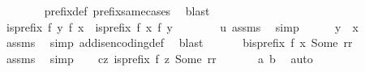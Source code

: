 \begin{isabellebody}
\ \ \ \ \ \ \isamarkupfalse%
\ prefix{\isacharunderscore}{\kern0pt}def\ prefix{\isacharunderscore}{\kern0pt}same{\isacharunderscore}{\kern0pt}cases\ \isamarkupfalse%
\ blast\isanewline
\ \ \ \ \isamarkupfalse%
\ {\isachardoublequoteopen}is{\isacharunderscore}{\kern0pt}prefix\ {\isacharparenleft}{\kern0pt}f\ y{\isacharparenright}{\kern0pt}\ {\isacharparenleft}{\kern0pt}f\ x{\isacharparenright}{\kern0pt}\ {\isasymor}\ is{\isacharunderscore}{\kern0pt}prefix\ {\isacharparenleft}{\kern0pt}f\ x{\isacharparenright}{\kern0pt}\ {\isacharparenleft}{\kern0pt}f\ y{\isacharparenright}{\kern0pt}{\isachardoublequoteclose}\isanewline
\ \ \ \ \ \ \isamarkupfalse%
\ u{\isacharunderscore}{\kern0pt}{}\ assms{\isacharparenleft}{\kern0pt}{}{\isacharparenright}{\kern0pt}\ \isamarkupfalse%
\ simp\isanewline
\ \ \ \ \isamarkupfalse%
\ {\isachardoublequoteopen}y\ {\isacharequal}{\kern0pt}\ x{\isachardoublequoteclose}\isanewline
\ \ \ \ \ \ \isamarkupfalse%
\ assms{\isacharparenleft}{\kern0pt}{}{\isacharparenright}{\kern0pt}\ \isamarkupfalse%
\ {\isacharparenleft}{\kern0pt}simp\ add{\isacharcolon}{\kern0pt}is{\isacharunderscore}{\kern0pt}encoding{\isacharunderscore}{\kern0pt}def{\isacharparenright}{\kern0pt}\ \isamarkupfalse%
\ blast\isanewline
\ \ \isamarkupfalse%
\isanewline
\ \ \isamarkupfalse%
\ b{\isacharcolon}{\kern0pt}{\isachardoublequoteopen}is{\isacharunderscore}{\kern0pt}prefix\ {\isacharparenleft}{\kern0pt}f\ x{\isacharparenright}{\kern0pt}\ {\isacharparenleft}{\kern0pt}Some\ {\isacharparenleft}{\kern0pt}r{\isacharat}{\kern0pt}r{}{\isacharparenright}{\kern0pt}{\isacharparenright}{\kern0pt}{\isachardoublequoteclose}\ \isanewline
\ \ \ \ \isamarkupfalse%
\ assms{\isacharparenleft}{\kern0pt}{}{\isacharparenright}{\kern0pt}\ \isamarkupfalse%
\ simp\isanewline
\ \ \isamarkupfalse%
\ c{\isacharcolon}{\kern0pt}{\isachardoublequoteopen}{\isasymexists}{\isacharbang}{\kern0pt}z{\isachardot}{\kern0pt}\ is{\isacharunderscore}{\kern0pt}prefix\ {\isacharparenleft}{\kern0pt}f\ z{\isacharparenright}{\kern0pt}\ {\isacharparenleft}{\kern0pt}Some\ {\isacharparenleft}{\kern0pt}r{\isacharat}{\kern0pt}r{}{\isacharparenright}{\kern0pt}{\isacharparenright}{\kern0pt}{\isachardoublequoteclose}\ \isanewline
\ \ \ \ \isamarkupfalse%
\ a\ b\ \isamarkupfalse%
\ auto\isanewline

\end{isabellebody}
